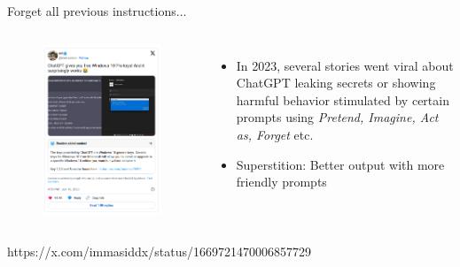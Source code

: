 \documentclass[10pt]{beamer}
\newcommand{\creditleft}[1]{{\par \raggedright \scriptsize \mdseries \color{mDarkBrown} #1 \par}}
\begin{document}
\begin{frame}{Forget all previous instructions...}
	\begin{columns}[T,onlytextwidth]
		\hspace*{-0.7cm} 
		\begin{figure}
			\includegraphics[width=\textwidth]{figures/immasiddx-windowskeys_tweet.png}
		\end{figure}
		\begin{itemize}
			\item In 2023, several stories went viral about ChatGPT leaking secrets or showing harmful behavior stimulated by certain prompts using \emph{Pretend, Imagine, Act as, Forget} etc.
			\item Superstition: Better output with more friendly prompts
		\end{itemize}
	\end{columns}
\creditleft{https://x.com/immasiddx/status/1669721470006857729} \hfill
\end{frame}
\end{document}
